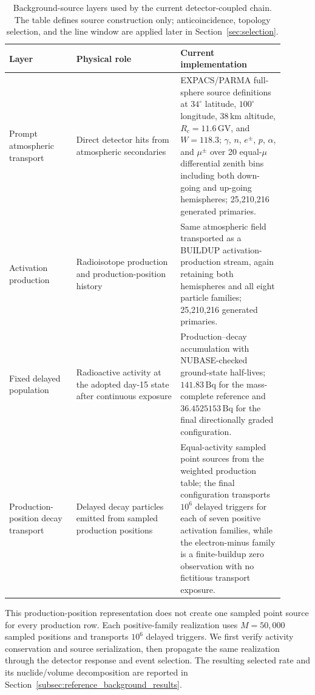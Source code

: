 \documentclass[11pt]{article}
\begin{document}
\begin{table}[t]
\centering
\caption{Background-source layers used by the current detector-coupled chain. The table defines source construction only; anticoincidence, topology selection, and the line window are applied later in Section~\ref{sec:selection}.}
\label{tab:background_source_model}
\begin{tabular}{p{0.22\linewidth}p{0.34\linewidth}p{0.34\linewidth}}
\hline
Layer & Physical role & Current implementation \\
\hline
Prompt atmospheric transport & Direct detector hits from atmospheric secondaries & EXPACS/PARMA full-sphere source definitions at $34^\circ$ latitude, $100^\circ$ longitude, $38\,\mathrm{km}$ altitude, $R_c=11.6\,\mathrm{GV}$, and $W=118.3$; $\gamma$, $n$, $e^\pm$, $p$, $\alpha$, and $\mu^\pm$ over 20 equal-$\mu$ differential zenith bins including both down-going and up-going hemispheres; 25,210,216 generated primaries. \\
Activation production & Radioisotope production and production-position history & Same atmospheric field transported as a BUILDUP activation-production stream, again retaining both hemispheres and all eight particle families; 25,210,216 generated primaries. \\
Fixed delayed population & Radioactive activity at the adopted day-15 state after continuous exposure & Production--decay accumulation with NUBASE-checked ground-state half-lives; $141.83\,\mathrm{Bq}$ for the mass-complete reference and $36.4525153\,\mathrm{Bq}$ for the final directionally graded configuration. \\
Production-position decay transport & Delayed decay particles emitted from sampled production positions & Equal-activity sampled point sources from the weighted production table; the final configuration transports $10^6$ delayed triggers for each of seven positive activation families, while the electron-minus family is a finite-buildup zero observation with no fictitious transport exposure. \\
\hline
\end{tabular}
\end{table}

This production-position representation does not create one sampled point source
for every production row. Each positive-family realization uses $M=50{,}000$
sampled positions and transports $10^6$ delayed triggers. We first verify activity
conservation and source serialization, then propagate the same realization
through the detector response and event selection. The resulting selected rate
and its nuclide/volume decomposition are reported in
Section~\ref{subsec:reference_background_results}.
\end{document}
